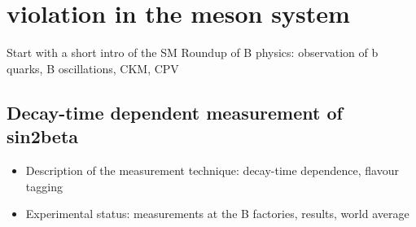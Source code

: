 
\chapter[
  head={\CP violation in the \Bd meson system},
  tocentry={\CPbfsf violation in the \Bdbfsf meson system}]
{\CPbfsf violation in the \Bdbfsf meson system}
\label{ch:cpv_theory}

Start with a short intro of the SM
Roundup of B physics: observation of b quarks, B oscillations, CKM, CPV







\clearpage
\section{Decay-time dependent measurement of sin2beta}
\begin{itemize}
  \item Description of the measurement technique: decay-time dependence, flavour tagging
  \item Experimental status: measurements at the B factories, results, world average
\end{itemize}
